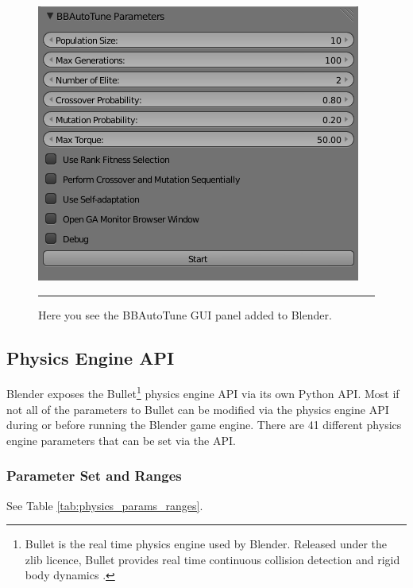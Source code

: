 \begin{figure}[htbp]
\centering
\includegraphics[scale=0.6]{../Figures/Chapter4/bbautotune_gui.png}
\rule{35em}{0.5pt}
\caption[BBAutoTune GUI Panel]{Here you see the BBAutoTune GUI panel added to Blender.}
\label{fig:bbautotune_gui}
\end{figure}

\subsection{Physics Engine API}

Blender exposes the Bullet\footnote{Bullet is the real time physics engine used by Blender. Released under the zlib licence, Bullet provides real time continuous collision detection and rigid body dynamics \cite{website:continuousphysics}.} physics engine API via its own Python API. Most if not all of the parameters to Bullet can be modified via the physics engine API during or before running the Blender game engine. There are 41 different physics engine parameters that can be set via the API.

\subsubsection{Parameter Set and Ranges}

See Table \ref{tab:physics_params_ranges}.

